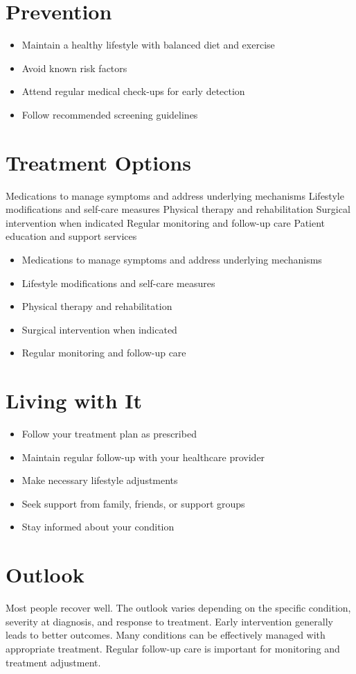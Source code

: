 \section{Prevention}
\begin{itemize}[noitemsep]
  \item Maintain a healthy lifestyle with balanced diet and exercise
  \item Avoid known risk factors
  \item Attend regular medical check-ups for early detection
  \item Follow recommended screening guidelines
\end{itemize}
\section{Treatment Options}
Medications to manage symptoms and address underlying mechanisms Lifestyle modifications and self-care measures Physical therapy and rehabilitation Surgical intervention when indicated Regular monitoring and follow-up care Patient education and support services

\begin{itemize}[noitemsep]
  \item Medications to manage symptoms and address underlying mechanisms
  \item Lifestyle modifications and self-care measures
  \item Physical therapy and rehabilitation
  \item Surgical intervention when indicated
  \item Regular monitoring and follow-up care
\end{itemize}
\section{Living with It}
\begin{itemize}[noitemsep]
  \item Follow your treatment plan as prescribed
  \item Maintain regular follow-up with your healthcare provider
  \item Make necessary lifestyle adjustments
  \item Seek support from family, friends, or support groups
  \item Stay informed about your condition
\end{itemize}
\section{Outlook}
Most people recover well. The outlook varies depending on the specific condition, severity at diagnosis, and response to treatment. Early intervention generally leads to better outcomes. Many conditions can be effectively managed with appropriate treatment. Regular follow-up care is important for monitoring and treatment adjustment.
